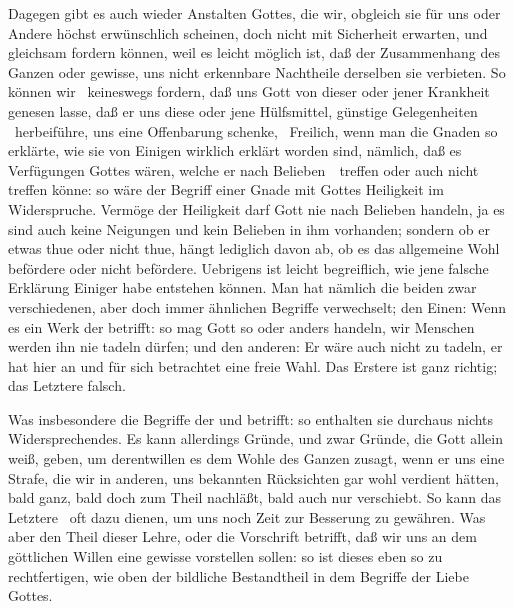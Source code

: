 \begin{aufza}
\item Dagegen gibt es auch wieder Anstalten Gottes, die wir, obgleich sie für uns oder Andere höchst erwünschlich scheinen, doch nicht mit Sicherheit erwarten, und gleichsam fordern können, weil es leicht möglich ist, daß der Zusammenhang des Ganzen oder gewisse, uns nicht erkennbare Nachtheile derselben sie verbieten. So können wir \zB\ keineswegs fordern, daß uns Gott von dieser oder jener Krankheit genesen lasse, daß er uns diese oder jene Hülfsmittel, günstige Gelegenheiten \udgl\  herbeiführe, uns eine Offenbarung schenke, \usw\ Freilich, wenn man die Gnaden so erklärte, wie sie von Einigen wirklich erklärt worden sind, nämlich, daß es Verfügungen Gottes wären, welche er nach Belieben~\ treffen oder auch nicht treffen könne: so wäre der Begriff einer Gnade mit Gottes Heiligkeit im Widerspruche. Vermöge der Heiligkeit darf Gott nie nach Belieben handeln, ja es sind auch keine Neigungen und kein Belieben in ihm vorhanden; sondern ob er etwas thue oder nicht thue, hängt lediglich davon ab, ob es das allgemeine Wohl befördere oder nicht befördere. Uebrigens ist leicht begreiflich, wie jene falsche Erklärung Einiger habe entstehen können. Man hat nämlich die beiden zwar verschiedenen, aber doch immer ähnlichen Begriffe verwechselt; den Einen: Wenn es ein Werk der  betrifft: so mag Gott so oder anders handeln, wir Menschen werden ihn nie tadeln dürfen; und den anderen: Er wäre auch  nicht zu tadeln, er hat hier an und für sich betrachtet eine freie Wahl. Das Erstere ist ganz richtig; das Letztere falsch.
\item Was insbesondere die Begriffe der  und  betrifft: so enthalten sie durchaus nichts Widersprechendes. Es kann allerdings Gründe, und zwar Gründe, die Gott allein weiß, geben, um derentwillen es dem Wohle des Ganzen zusagt, wenn er uns eine Strafe, die wir in anderen, uns bekannten Rücksichten gar wohl verdient hätten, bald ganz, bald doch zum Theil nachläßt, bald auch nur verschiebt. So kann das Letztere \zB\ oft dazu dienen, um uns noch Zeit zur Besserung zu gewähren. Was aber den  Theil dieser Lehre, oder die Vorschrift betrifft, daß wir uns an dem göttlichen Willen eine gewisse  vorstellen sollen: so ist dieses eben so zu rechtfertigen, wie oben der bildliche Bestandtheil in dem Begriffe der Liebe Gottes.
\end{aufza}

